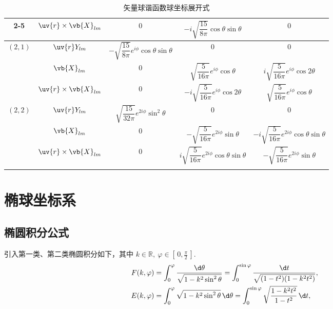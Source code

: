 \begin{longtable}{ccccc}
	\cmidrule(lr){2-5}
	          & \(\uv{r}\times\vb{X}_{lm}\) & \(0\)                                                     & \(-i\sqrt{\dfrac{15}{8\pi}}\cos\theta\sin\theta\)           & \(0\)                                                        \\
	\midrule
	\multirow{3}{*}{\((2,1)\)}
	          & \(\uv{r}Y_{lm}\)            & \(-\sqrt{\dfrac{15}{8\pi}}e^{i\phi}\cos\theta\sin\theta\) & \(0\)                                                       & \(0\)                                                        \\
	\cmidrule(lr){2-5}
	          & \(\vb{X}_{lm}\)             & \(0\)                                                     & \(\sqrt{\dfrac{5}{16\pi}}e^{i\phi}\cos\theta\)              & \(i\sqrt{\dfrac{5}{16\pi}}e^{i\phi}\cos2\theta\)             \\
	\cmidrule(lr){2-5}
	          & \(\uv{r}\times\vb{X}_{lm}\) & \(0\)                                                     & \(-i\sqrt{\dfrac{5}{16\pi}}e^{i\phi}\cos2\theta\)           & \(\sqrt{\dfrac{5}{16\pi}}e^{i\phi}\cos\theta\)               \\
	\midrule
	\multirow{3}{*}{\((2,2)\)}
	          & \(\uv{r}Y_{lm}\)            & \(\sqrt{\dfrac{15}{32\pi}}e^{2i\phi}\sin^2\theta\)        & \(0\)                                                       & \(0\)                                                        \\
	\cmidrule(lr){2-5}
	          & \(\vb{X}_{lm}\)             & \(0\)                                                     & \(-\sqrt{\dfrac{5}{16\pi}}e^{2i\phi}\sin\theta\)            & \(-i\sqrt{\dfrac{5}{16\pi}}e^{2i\phi}\cos\theta\sin\theta\)  \\
	\cmidrule(lr){2-5}
	          & \(\uv{r}\times\vb{X}_{lm}\) & \(0\)                                                     & \(i\sqrt{\dfrac{5}{16\pi}}e^{2i\phi}\cos\theta\sin\theta\)  & \(-\sqrt{\dfrac{5}{16\pi}}e^{2i\phi}\sin\theta\)             \\
	\bottomrule[1pt]
	\caption{矢量球谐函数球坐标展开式}
	\label{矢量球谐函数球坐标展开式}
\end{longtable}
\endgroup

\newpage
\section{椭球坐标系}
\label{椭球坐标系小节}

\subsection{椭圆积分公式}
引入第一类、第二类椭圆积分如下，其中 \(k\in\mathbb{R},\ \varphi\in[\,0,\tfrac\pi2\,]\).
\begin{align*}
	F(k,\varphi)
	 & =\int_{0}^{\varphi}\frac{\d \theta}{\sqrt{1 - k^2\sin^2\theta}}
	=\int_{0}^{\sin\varphi}\frac{\d t}{\sqrt{(1 - t^2)(1 - k^2t^2)}},  \\
	E(k,\varphi)
	 & =\int_{0}^{\varphi}\sqrt{1 - k^2\sin^2\theta}\,\d \theta
	=\int_{0}^{\sin\varphi}\sqrt{\frac{1 - k^2t^2}{1 - t^2}}\,\d t,
\end{align*}

